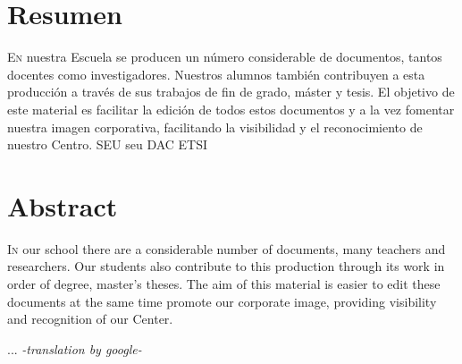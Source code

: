 \chapter*{Resumen}
\pagestyle{especial}
{}

\lettrine[lraise=-0.1, lines=2, loversize=0.2]{E}{n} nuestra Escuela se producen un número considerable de documentos,
tantos docentes como investigadores. Nuestros alumnos también contribuyen a esta producción a través de sus trabajos de
fin de grado, máster y tesis. El objetivo de este material es facilitar la edición de todos estos documentos y a la vez
fomentar nuestra imagen corporativa, facilitando la visibilidad y el reconocimiento de nuestro Centro. \gls{SEU} seu DAC
\gls{ETSI}



\chapter*{Abstract}
\pagestyle{especial}
{}

\lettrine[lraise=-0.1, lines=2, loversize=0.2]{I}{n} our school there are a considerable number of documents, many teachers and researchers. Our students also contribute to this production through its work in order of degree, master's theses. The aim of this material is easier to edit these documents at the same time promote our corporate image, providing visibility and recognition of our Center. 

...
\emph{-translation by google-}

